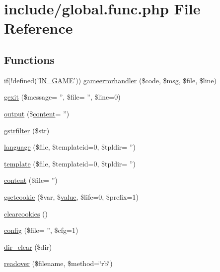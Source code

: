 \hypertarget{global_8func_8php}{\section{include/global.func.\+php File Reference}
\label{global_8func_8php}
}
\subsection*{Functions}
\begin{DoxyCompactItemize}
\item 
\hyperlink{login__old_8php_a4ac1118c2e44c513a674bc1793ba6c90}{if}(!defined('\hyperlink{templates_2install_8php_a12c82f3d28569a3f80804f1e72cef14c}{I\+N\+\_\+\+G\+A\+M\+E}')) \hyperlink{global_8func_8php_a2ab748fd10986d09f87f0651489e0fc2}{gameerrorhandler} (\$code, \$msg, \$file, \$line)
\item 
\hyperlink{global_8func_8php_a9fc250394d1444dba4b97ea3a894fcb9}{gexit} (\$message= '', \$file= '', \$line=0)
\item 
\hyperlink{global_8func_8php_aacaca1dd81eba78d1d4363ca06608961}{output} (\$\hyperlink{global_8func_8php_a6e7e9a077ba830463e605a5a0996fbba}{content}= '')
\item 
\hyperlink{global_8func_8php_a2b7ece9137321f3300ce816cab600087}{gstrfilter} (\$str)
\item 
\hyperlink{global_8func_8php_a5f37600fd0e8f994e7fd61fe32e7e18a}{language} (\$file, \$templateid=0, \$tpldir= '')
\item 
\hyperlink{global_8func_8php_a771b4d6b781f2a19234e18314036fe79}{template} (\$file, \$templateid=0, \$tpldir= '')
\item 
\hyperlink{global_8func_8php_a6e7e9a077ba830463e605a5a0996fbba}{content} (\$file= '')
\item 
\hyperlink{global_8func_8php_a0bde0848a6d613af6ac9f33d0ae72901}{gsetcookie} (\$var, \$\hyperlink{1__chat_8tpl_8php_afcc7a4b78ecd8fa7e713f8cfa0f51017}{value}, \$life=0, \$prefix=1)
\item 
\hyperlink{global_8func_8php_a148927cefc24862a29db09b70762a72b}{clearcookies} ()
\item 
\hyperlink{global_8func_8php_a239de3ed26da8daceb8acacdcb03325d}{config} (\$file= '', \$cfg=1)
\item 
\hyperlink{global_8func_8php_afe48521b311213a1f840bbecaa10324f}{dir\+\_\+clear} (\$dir)
\item 
\hyperlink{global_8func_8php_a763dbb0f5a4c9cb67913ec12c030a687}{readover} (\$filename, \$method=\char`\"{}rb\char`\"{})

\end{DoxyCompactItemize}
